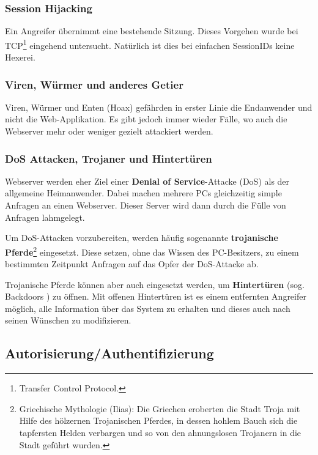 \subsubsection*{Session Hijacking}

Ein Angreifer übernimmt eine bestehende Sitzung. Dieses Vorgehen wurde bei
TCP\footnote{Transfer Control Protocol.}
eingehend untersucht. Natürlich ist dies bei einfachen SessionIDs keine Hexerei.

\subsubsection*{Viren, Würmer und anderes Getier}

Viren, Würmer und Enten (Hoax) gefährden in erster Linie die Endanwender und
nicht die Web-Applikation. Es gibt jedoch immer wieder Fälle, wo auch die
Webserver mehr oder weniger gezielt attackiert werden.

\subsubsection*{DoS Attacken, Trojaner und Hintertüren}
\label{subsub:dos}

Webserver werden eher Ziel einer \textbf{Denial of Service}-Attacke (DoS) als der
allgemeine Heimanwender. Dabei machen mehrere PCs gleichzeitig simple Anfragen
an einen Webserver. Dieser Server wird dann durch die Fülle von Anfragen lahmgelegt.

Um DoS-Attacken vorzubereiten, werden häufig sogenannte
\textbf{trojanische Pferde}\footnote{Griechische Mythologie (Ilias): Die Griechen
eroberten die Stadt Troja mit Hilfe des hölzernen Trojanischen Pferdes,
in dessen hohlem Bauch sich die tapfersten Helden verbargen und so von den
ahnungslosen Trojanern in die Stadt geführt wurden.}
eingesetzt. Diese setzen, ohne das Wissen des PC-Besitzers, zu einem bestimmten
Zeitpunkt Anfragen auf das Opfer der DoS-Attacke ab.

Trojanische Pferde können aber auch eingesetzt werden, um \textbf{Hintertüren}
(sog. Backdoors ) zu öffnen. Mit offenen Hintertüren ist es einem entfernten
Angreifer möglich, alle Information über das System zu erhalten und dieses
auch nach seinen Wünschen zu modifizieren.

\subsection{Autorisierung/Authentifizierung}

